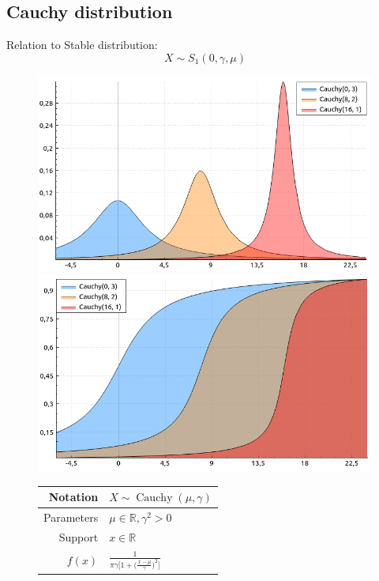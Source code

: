 \documentclass[a4paper,11pt]{article}
\theoremstyle{plain}
\theoremstyle{definition}
\newcommand{\MR}{\mathbb{R}}
\begin{document}
\subsection{Cauchy distribution}
	Relation to Stable distribution:
	\[X \sim S_{1}(0, \gamma, \mu) \]
		\begin{figure}[!htb]\centering
		\begin{minipage}{0.55\textwidth}
			\includegraphics[width=\linewidth, right]{cauchy_pdf}
			\captionsetup{labelformat=empty}
			\includegraphics[width=\linewidth, right]{cauchy_cdf}
			\captionsetup{labelformat=empty}
		\end{minipage}
		\begin{minipage}{0.4\textwidth}
		\begin{tabular}{| r | l |}
			\hline
			Notation & $X \sim \operatorname{Cauchy}(\mu, \gamma)$ \\
			\hline
			Parameters & $\mu \in \MR, \gamma^2 > 0 $ \\
			\hline
			Support & $x \in \MR$  \\
			\hline
			$f(x)$ & $ \frac{1}{ \pi \gamma \Big[ 1 + \big( \frac{x-\mu}{\gamma} \big)^2 \Big]  }  $ \\

\end{tabular}
\end{minipage}
\end{figure}
\end{document}
